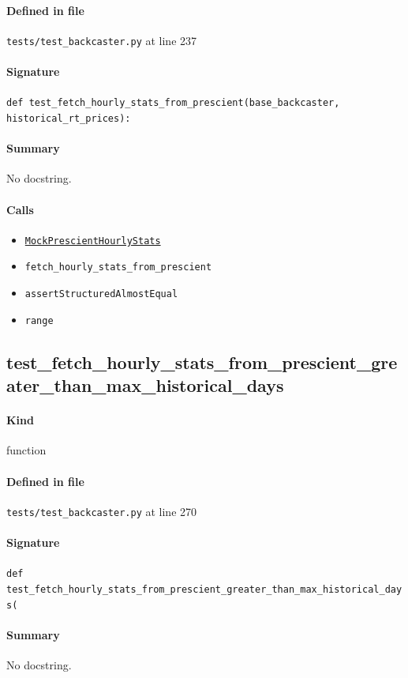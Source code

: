 \documentclass[11pt]{report}
\begin{document}
\paragraph{Defined in file} \texttt{tests/test\_backcaster.py} at line 237
\paragraph{Signature} \texttt{def test\_fetch\_hourly\_stats\_from\_prescient(base\_backcaster, historical\_rt\_prices):}
\paragraph{Summary} No docstring.
\paragraph{Calls}
\begin{itemize}[leftmargin=*]
  \item \hyperref[def:tests-test_backcaster.py:MockPrescientHourlyStats:L231]{\texttt{MockPrescientHourlyStats}}
  \item \texttt{fetch\_hourly\_stats\_from\_prescient}
  \item \texttt{assertStructuredAlmostEqual}
  \item \texttt{range}
\end{itemize}
\subsection{test\_fetch\_hourly\_stats\_from\_prescient\_greater\_than\_max\_historical\_days}
\label{def:tests-test_backcaster.py:test_fetch_hourly_stats_from_prescient_greater_than_max_historical_days:L270}
\paragraph{Kind} function
\paragraph{Defined in file} \texttt{tests/test\_backcaster.py} at line 270
\paragraph{Signature} \texttt{def test\_fetch\_hourly\_stats\_from\_prescient\_greater\_than\_max\_historical\_days(}
\paragraph{Summary} No docstring.
\end{document}
